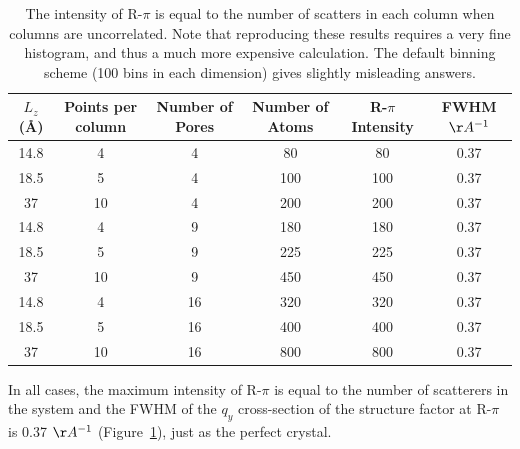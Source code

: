 \documentclass{article}
\begin{document}
  \begin{table}[!htb]
  \centering
  \begin{tabular}{c c c c c c}
  \toprule
  $L_z$ (\AA) & Points per column & Number of Pores & Number of Atoms & R-$\pi$ Intensity & FWHM $\AA^{-1}$ \\
  \midrule
  14.8        &      4            & 4               & 80              &  80               & 0.37           \\
  18.5        &      5            & 4               & 100             &  100              & 0.37           \\
  37          &      10           & 4               & 200             &  200              & 0.37           \\
  14.8        &      4            & 9               & 180             &  180              & 0.37           \\
  18.5        &      5            & 9               & 225             &  225              & 0.37           \\
  37          &      10           & 9               & 450             &  450              & 0.37           \\
  14.8        &      4            & 16              & 320             &  320              & 0.37           \\
  18.5        &      5            & 16              & 400             &  400              & 0.37           \\
  37          &      10           & 16              & 800             &  800              & 0.37           \\
  \bottomrule
  \end{tabular}
  \caption{The intensity of R-$\pi$ is equal to the number of scatters in
   each column when columns are uncorrelated. Note that reproducing these results requires a very fine histogram, 
   and thus a much more expensive calculation. The default binning scheme (100 bins in each dimension) gives slightly
   misleading answers.}\label{table:randomly_rotated_layers}
  \end{table}

  In all cases, the maximum intensity of R-$\pi$ is equal to the number of
  scatterers in the system and the FWHM of the $q_y$ cross-section of the
  structure factor at R-$\pi$ is 0.37 $\AA^{-1}$
  (Figure~\ref{table:randomly_rotated_layers}), just as the perfect crystal.
\end{document}
